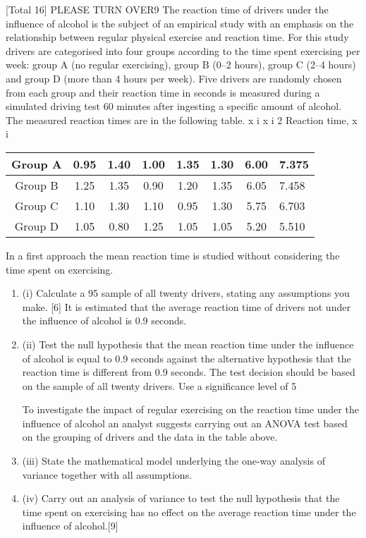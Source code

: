 \documentclass[a4paper,12pt]{article}
\begin{document}
[Total 16]
PLEASE TURN OVER9
The reaction time of drivers under the influence of alcohol is the subject of an
empirical study with an emphasis on the relationship between regular physical
exercise and reaction time. For this study drivers are categorised into four groups
according to the time spent exercising per week: group A (no regular exercising),
group B (0–2 hours), group C (2–4 hours) and group D (more than 4 hours per week).
Five drivers are randomly chosen from each group and their reaction time in seconds
is measured during a simulated driving test 60 minutes after ingesting a specific
amount of alcohol. The measured reaction times are in the following table.
\sum x i \sum x i 2
Reaction time, x i


\begin{center}
\begin{tabular}{ccccccc} \hline
Group A& 0.95& 1.40& 1.00& 1.35& 1.30& 6.00& 7.375 \\ \hline
Group B& 1.25& 1.35& 0.90& 1.20& 1.35& 6.05& 7.458 \\ \hline
Group C& 1.10& 1.30& 1.10& 0.95& 1.30& 5.75& 6.703 \\ \hline
Group D& 1.05& 0.80& 1.25& 1.05& 1.05& 5.20& 5.510 \\ \hline
\end{tabular}
\end{center}

In a first approach the mean reaction time is studied without considering the time
spent on exercising.
\begin{enumerate}
\item (i)
Calculate a 95%
sample of all twenty drivers, stating any assumptions you make.
[6]
It is estimated that the average reaction time of drivers not under the influence of
alcohol is 0.9 seconds.
\item (ii)
Test the null hypothesis that the mean reaction time under the influence of
alcohol is equal to 0.9 seconds against the alternative hypothesis that the
reaction time is different from 0.9 seconds. The test decision should be based
on the sample of all twenty drivers. Use a significance level of 5%

To investigate the impact of regular exercising on the reaction time under the
influence of alcohol an analyst suggests carrying out an ANOVA test based on the
grouping of drivers and the data in the table above.
\item (iii) State the mathematical model underlying the one-way analysis of variance
together with all assumptions.
\item 
(iv) Carry out an analysis of variance to test the null hypothesis that the time spent
on exercising has no effect on the average reaction time under the influence of
alcohol.[9]
\end{enumerate}
\end{document}
